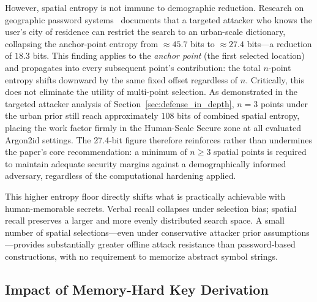 \documentclass[mathematics,article,accept,pdftex,moreauthors]{Definitions/mdpi}
\begin{document}
However, spatial entropy is not immune to demographic reduction. Research on geographic password systems~\cite{Sun2012, Thorpe2013, AlAmeen2014} documents that a targeted attacker who knows the user's city of residence can restrict the search to an urban-scale dictionary, collapsing the anchor-point entropy from $\approx\!45.7$ bits to $\approx\!27.4$ bits---a reduction of $18.3$ bits. This finding applies to the \emph{anchor point} (the first selected location) and propagates into every subsequent point's contribution: the total $n$-point entropy shifts downward by the same fixed offset regardless of $n$. Critically, this does not eliminate the utility of multi-point selection. As demonstrated in the targeted attacker analysis of Section~\ref{sec:defense_in_depth}, $n=3$ points under the urban prior still reach approximately $108$ bits of combined spatial entropy, placing the work factor firmly in the Human-Scale Secure zone at all evaluated Argon2id settings. The 27.4-bit figure therefore reinforces rather than undermines the paper's core recommendation: a minimum of $n \geq 3$ spatial points is required to maintain adequate security margins against a demographically informed adversary,
 regardless of the computational hardening applied.

{This higher entropy floor directly shifts what is practically achievable with human-memorable secrets. Verbal recall collapses under selection bias; spatial recall preserves a larger and more evenly distributed search space. A small number of spatial selections---even under conservative attacker prior assumptions---provides substantially greater offline attack resistance than password-based constructions, with no requirement to memorize abstract symbol strings.}

\subsection{Impact of Memory-Hard Key Derivation}
\end{document}

